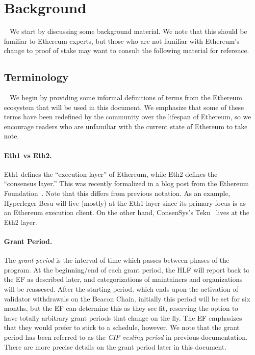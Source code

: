 \section{Background}~\label{sec:background}
We start by discussing some background material.  We note that this should be familiar to Ethereum experts, but those who are not familiar with Ethereum's change to proof of stake may want to consult the following material for reference.

\subsection{Terminology}~\label{sec:defs}
We begin by providing some informal definitions of terms from the Ethereum ecosystem that will be used in this document.  We emphasize that some of these terms have been redefined by the community over the lifespan of Ethereum, so we encourage readers who are unfamiliar with the current state of Ethereum to take note.

\paragraph{Eth1 vs Eth2.}  Eth1 defines the ``execution layer'' of Ethereum, while Eth2 defines the ``consensus layer.''  This was recently formalized in a blog post from the Ethereum Foundation~\cite{Eth1-2}.  Note that this differs from previous notation.  As an example, Hyperleger Besu will live (mostly) at the Eth1 layer since its primary focus is as an Ethereum execution client.  On the other hand, ConsenSys's Teku~\cite{Teku} lives at the Eth2 layer.

\paragraph{Grant Period.}  The \emph{grant period} is the interval of time which passes between phases of the program.  At the beginning/end of each grant period, the HLF will report back to the EF as described later, and categorizations of maintainers and organizations will be reassesed.  After the starting period, which ends upon the activation of validator withdrawals on the Beacon Chain, initially this period will be set for six months, but the EF can determine this as they see fit, reserving the option to have totally arbitrary grant periods that change on the fly.  The EF emphasizes that they would prefer to stick to a schedule, however.  We note that the grant period has been referred to as the \emph{CIP vesting period} in previous documentation.  There are more precise details on the grant period later in this document.

